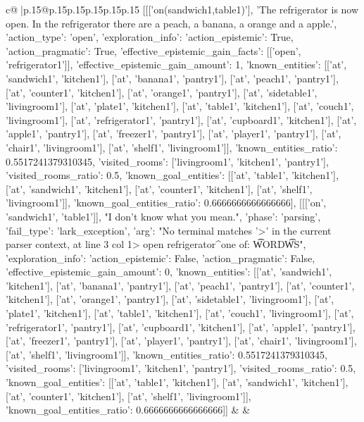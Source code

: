 \documentclass{article}
\begin{document}
{\begin{supertabular}{c@{$\;$}|p{.15\linewidth}@{}p{.15\linewidth}p{.15\linewidth}p{.15\linewidth}p{.15\linewidth}p{.15\linewidth}}
{{{	 [[['on(sandwich1,table1)'], 'The refrigerator is now open. In the refrigerator there are a peach, a banana, a orange and a apple.', {'action_type': 'open', 'exploration_info': {'action_epistemic': True, 'action_pragmatic': True, 'effective_epistemic_gain_facts': [['open', 'refrigerator1']], 'effective_epistemic_gain_amount': 1, 'known_entities': [['at', 'sandwich1', 'kitchen1'], ['at', 'banana1', 'pantry1'], ['at', 'peach1', 'pantry1'], ['at', 'counter1', 'kitchen1'], ['at', 'orange1', 'pantry1'], ['at', 'sidetable1', 'livingroom1'], ['at', 'plate1', 'kitchen1'], ['at', 'table1', 'kitchen1'], ['at', 'couch1', 'livingroom1'], ['at', 'refrigerator1', 'pantry1'], ['at', 'cupboard1', 'kitchen1'], ['at', 'apple1', 'pantry1'], ['at', 'freezer1', 'pantry1'], ['at', 'player1', 'pantry1'], ['at', 'chair1', 'livingroom1'], ['at', 'shelf1', 'livingroom1']], 'known_entities_ratio': 0.5517241379310345, 'visited_rooms': ['livingroom1', 'kitchen1', 'pantry1'], 'visited_rooms_ratio': 0.5, 'known_goal_entities': [['at', 'table1', 'kitchen1'], ['at', 'sandwich1', 'kitchen1'], ['at', 'counter1', 'kitchen1'], ['at', 'shelf1', 'livingroom1']], 'known_goal_entities_ratio': 0.6666666666666666}}], [[['on', 'sandwich1', 'table1']], "I don't know what you mean.", {'phase': 'parsing', 'fail_type': 'lark_exception', 'arg': "No terminal matches '>' in the current parser context, at line 3 col 1\n\n> open refrigerator\n^\nExpected one of: \n\t* WORD\n\t* WS\n", 'exploration_info': {'action_epistemic': False, 'action_pragmatic': False, 'effective_epistemic_gain_amount': 0, 'known_entities': [['at', 'sandwich1', 'kitchen1'], ['at', 'banana1', 'pantry1'], ['at', 'peach1', 'pantry1'], ['at', 'counter1', 'kitchen1'], ['at', 'orange1', 'pantry1'], ['at', 'sidetable1', 'livingroom1'], ['at', 'plate1', 'kitchen1'], ['at', 'table1', 'kitchen1'], ['at', 'couch1', 'livingroom1'], ['at', 'refrigerator1', 'pantry1'], ['at', 'cupboard1', 'kitchen1'], ['at', 'apple1', 'pantry1'], ['at', 'freezer1', 'pantry1'], ['at', 'player1', 'pantry1'], ['at', 'chair1', 'livingroom1'], ['at', 'shelf1', 'livingroom1']], 'known_entities_ratio': 0.5517241379310345, 'visited_rooms': ['livingroom1', 'kitchen1', 'pantry1'], 'visited_rooms_ratio': 0.5, 'known_goal_entities': [['at', 'table1', 'kitchen1'], ['at', 'sandwich1', 'kitchen1'], ['at', 'counter1', 'kitchen1'], ['at', 'shelf1', 'livingroom1']], 'known_goal_entities_ratio': 0.6666666666666666}}]] 
	  } 
	   } 
	   } 
	 & & \\ 
 

    \theutterance {}  


\end{supertabular}}
\end{document}
